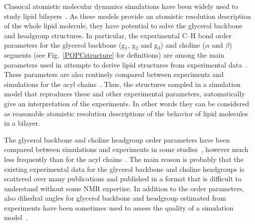\documentclass[pre,aps,floatfix,authordate1-4,twocolumn]{revtex4-1}
\begin{document}
Classical atomistic molecular dynamics simulations have been widely used to study  
lipid bilayers~\cite{tieleman97,klauda08,edholm08,tieleman10,piggot12,rabinovich13}. As these models provide an atomistic
resolution description of the whole lipid molecule, they have potential to solve the glycerol backbone and 
headgroup structures. In particular, the experimental C--H bond order parameters for the glycerol backbone 
(g$_1$, g$_2$ and g$_3$) and choline ($\alpha$ and $\beta$) segments (see Fig.~\ref{POPCstructure} for definitions) are among the main parameters used in
attempts to derive lipid structures from experimental data~\cite{seelig77b,skarjune79,jacobs80,davis83,akutsu91,hong95b,semchyschyn04}.
These parameters are also routinely compared between experiments and simulations for the acyl chains~\cite{tieleman97,klauda08,edholm08,tieleman10,piggot12}.
Thus, the structures sampled in a simulation model that reproduces these and other experimental parameters, automatically
give an interpretation of the experiments. In other words they can be considered as reasonable atomistic resolution descriptions of
the behavior of lipid molecules in a bilayer.

The glycerol backbone and choline headgroup order parameters have been compared between simulations and experiments
in some studies~\cite{shinoda97,hogberg08,castro08,klauda10,kapla12,dickson12,poger12,ferreira13,chowdhary13,maciejewski14}, 
however much less frequently than for the acyl  chains~\cite{tieleman97,klauda08,edholm08,tieleman10,piggot12}.
The main reason is probably that the existing experimental data for the glycerol backbone
and choline headgroups is scattered over many publications and published in a format that is difficult to understand without some NMR expertise. 
In addition to the order parameters, also dihedral angles for glycerol backbone and headgroup estimated from experiments have been sometimes used to 
assess the quality of a simulation model~\cite{robinson94,essex94,kothekar96,hyvonen97,shinoda97,duong99}.
\end{document}
